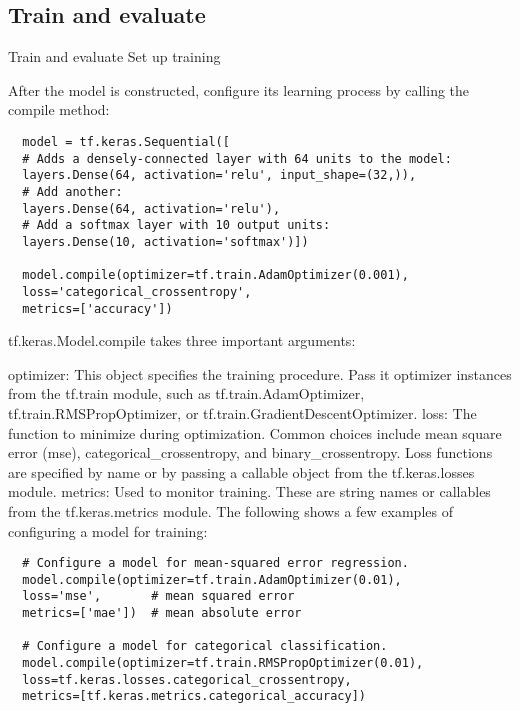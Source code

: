 \subsection{Train and evaluate}

Train and evaluate
Set up training

After the model is constructed, configure its learning process by calling the compile method:

\begin{verbatim}
  model = tf.keras.Sequential([
  # Adds a densely-connected layer with 64 units to the model:
  layers.Dense(64, activation='relu', input_shape=(32,)),
  # Add another:
  layers.Dense(64, activation='relu'),
  # Add a softmax layer with 10 output units:
  layers.Dense(10, activation='softmax')])

  model.compile(optimizer=tf.train.AdamOptimizer(0.001),
  loss='categorical_crossentropy',
  metrics=['accuracy'])

\end{verbatim}

tf.keras.Model.compile takes three important arguments:

optimizer: This object specifies the training procedure. Pass it optimizer instances from the tf.train module, such as tf.train.AdamOptimizer, tf.train.RMSPropOptimizer, or tf.train.GradientDescentOptimizer.
loss: The function to minimize during optimization. Common choices include mean square error (mse), categorical_crossentropy, and binary_crossentropy. Loss functions are specified by name or by passing a callable object from the tf.keras.losses module.
metrics: Used to monitor training. These are string names or callables from the tf.keras.metrics module.
\para{}
The following shows a few examples of configuring a model for training:
\begin{verbatim}
  # Configure a model for mean-squared error regression.
  model.compile(optimizer=tf.train.AdamOptimizer(0.01),
  loss='mse',       # mean squared error
  metrics=['mae'])  # mean absolute error

  # Configure a model for categorical classification.
  model.compile(optimizer=tf.train.RMSPropOptimizer(0.01),
  loss=tf.keras.losses.categorical_crossentropy,
  metrics=[tf.keras.metrics.categorical_accuracy])

\end{verbatim}

